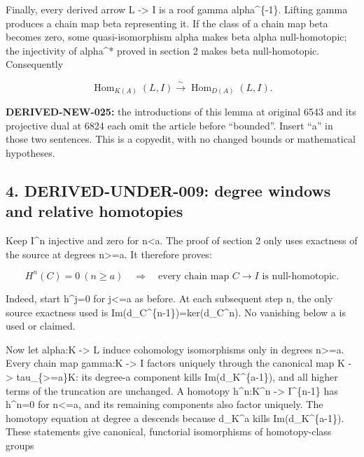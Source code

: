 Finally,\allowbreak{} every derived arrow L \allowbreak{}-> I is a roof gamma alpha\^{}\{-1\}. Lifting gamma produces a chain map beta representing it. If the class of a chain map beta becomes zero,\allowbreak{} some quasi-isomorphism alpha makes beta alpha null-homotopic; the injectivity of alpha\^{}* proved in section 2 makes beta null-homotopic. Consequently

\[
 \operatorname{Hom}_{K(A)}(L,I)
       \xrightarrow{\sim}\operatorname{Hom}_{D(A)}(L,I).  \tag{3.6}
\]

\textbf{DERIVED-NEW-025:\allowbreak{}} the introductions of this lemma at original 6543 and its projective dual at 6824 each omit the article before ``bounded''. Insert ``a'' in those two sentences. This is a copyedit,\allowbreak{} with no changed bounds or mathematical hypotheses.

\subsection{\texorpdfstring{4. DERIVED-UNDER-009:\allowbreak{} degree windows and relative homotopies}{4.  degree windows and relative homotopies}}\label{proofs-6209-7089-derived-under-009-degree-windows-and-relative-homotopies}

Keep I\^{}n injective and zero for n\textless a. The proof of section 2 only uses exactness of the source at degrees n>\allowbreak{}=a. It therefore proves:\allowbreak{}

\[
 H^n(C)=0\ (n\ge a)
 \quad\Longrightarrow\quad
 \text{every chain map }C\longrightarrow I
                    \text{ is null-homotopic}.          \tag{4.1}
\]

Indeed,\allowbreak{} start h\textasciicircum{}j\allowbreak{}=0 for j<\allowbreak{}=a as before. At each subsequent step n,\allowbreak{} the only source exactness used is Im(d\_\allowbreak{}C\textasciicircum{}\{n-1\})\allowbreak{}\allowbreak{}=ker(d\_\allowbreak{}C\textasciicircum{}n)\allowbreak{}. No vanishing below a is used or claimed.

Now let alpha:\allowbreak{}K \allowbreak{}-> L induce cohomology isomorphisms only in degrees n>\allowbreak{}=a. Every chain map gamma:\allowbreak{}K \allowbreak{}-> I factors uniquely through the canonical map K \allowbreak{}-> tau\_\allowbreak{}\{>\allowbreak{}=a\}K:\allowbreak{} its degree-a component kills Im(d\_\allowbreak{}K\textasciicircum{}\{a-1\})\allowbreak{},\allowbreak{} and all higher terms of the truncation are unchanged. A homotopy h\textasciicircum{}n:\allowbreak{}K\textasciicircum{}n \allowbreak{}-> I\^{}\{n-1\} has h\textasciicircum{}n\allowbreak{}=0 for n<\allowbreak{}=a,\allowbreak{} and its remaining components also factor uniquely. The homotopy equation at degree a descends because d\_\allowbreak{}K\textasciicircum{}a kills Im(d\_\allowbreak{}K\textasciicircum{}\{a-1\})\allowbreak{}. These statements give canonical,\allowbreak{} functorial isomorphisms of homotopy-class groups

